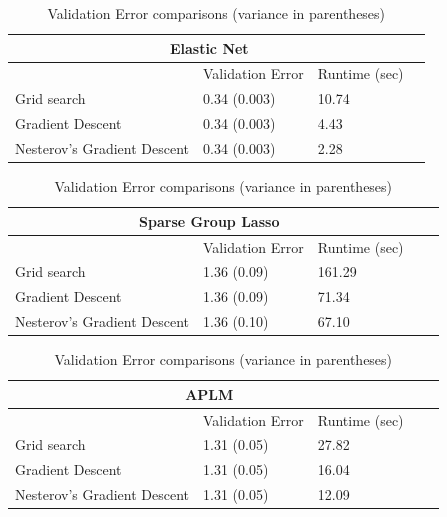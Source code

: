 \documentclass[10pt,letterpaper]{article}
\begin{document}
\begin{table} 
\begin{center}

\begin{tabular}{| l | l | l | l | }
\hline
\multicolumn{3}{|c|}{Elastic Net}\\
\hline
 & Validation Error & Runtime (sec) \\
\hline
Grid search & 0.34 (0.003) & 10.74\\
\hline
Gradient Descent & 0.34 (0.003) & 4.43 \\
\hline
Nesterov's Gradient Descent & 0.34 (0.003) & 2.28 \\
\hline
\end{tabular}


\begin{tabular}{| l | l | l | l | l | }
\hline
\multicolumn{3}{|c|}{Sparse Group Lasso}\\
\hline
 & Validation Error & Runtime (sec) \\
\hline
Grid search & 1.36 (0.09) & 161.29 \\
\hline
Gradient Descent  & 1.36 (0.09) & 71.34 \\
\hline
Nesterov's Gradient Descent  & 1.36 (0.10) & 67.10 \\
\hline
\end{tabular}

\begin{tabular}{| l | l | l | l | l | }
\hline
\multicolumn{3}{|c|}{APLM}\\
\hline
 & Validation Error & Runtime (sec) \\
\hline
Grid search  & 1.31 (0.05) & 27.82 \\
\hline
Gradient Descent  & 1.31 (0.05) & 16.04 \\
\hline
Nesterov's Gradient Descent  & 1.31 (0.05) & 12.09 \\
\hline
\end{tabular}

\end{center}
\caption {Validation Error comparisons (variance in parentheses)}
\label{table:validation}
\end{table}
\end{document}
